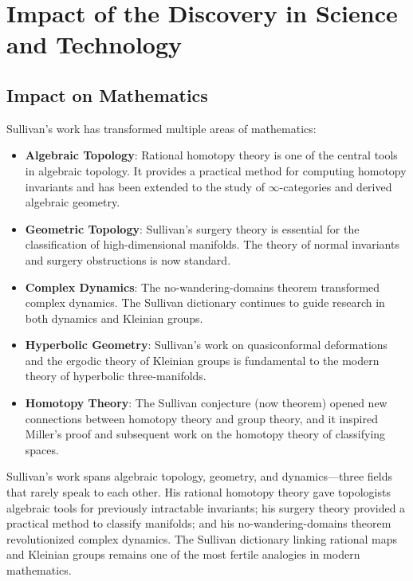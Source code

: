 \section{Impact of the Discovery in Science and Technology}

\subsection{Impact on Mathematics}

Sullivan's work has transformed multiple areas of mathematics:

\begin{itemize}
\item \textbf{Algebraic Topology}: Rational homotopy theory is one of the central tools in algebraic topology. It provides a practical method for computing homotopy invariants and has been extended to the study of $\infty$-categories and derived algebraic geometry.

\item \textbf{Geometric Topology}: Sullivan's surgery theory is essential for the classification of high-dimensional manifolds. The theory of normal invariants and surgery obstructions is now standard.

\item \textbf{Complex Dynamics}: The no-wandering-domains theorem transformed complex dynamics. The Sullivan dictionary continues to guide research in both dynamics and Kleinian groups.

\item \textbf{Hyperbolic Geometry}: Sullivan's work on quasiconformal deformations and the ergodic theory of Kleinian groups is fundamental to the modern theory of hyperbolic three-manifolds.

\item \textbf{Homotopy Theory}: The Sullivan conjecture (now theorem) opened new connections between homotopy theory and group theory, and it inspired Miller's proof and subsequent work on the homotopy theory of classifying spaces.
\end{itemize}

\begin{whyitmatters}
Sullivan's work spans algebraic topology, geometry, and dynamics---three fields that rarely speak to each other. His rational homotopy theory gave topologists algebraic tools for previously intractable invariants; his surgery theory provided a practical method to classify manifolds; and his no-wandering-domains theorem revolutionized complex dynamics. The Sullivan dictionary linking rational maps and Kleinian groups remains one of the most fertile analogies in modern mathematics.
\end{whyitmatters}

